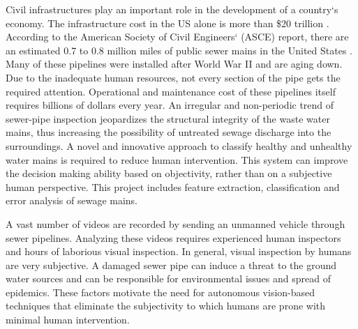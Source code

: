 \documentclass[letterpaper,12pt, onecolumn]{article}%
\begin{document}
Civil infrastructures play an important role in the development of a country`s economy. The infrastructure cost in the US alone is more than \$20 trillion \cite{iyer2013automated}. According to the American Society of Civil Engineers` (ASCE) report, there are an estimated 0.7 to 0.8 million miles of public sewer mains in the United States \cite{asce2013}. Many of these pipelines were installed after World War II and are aging down. Due to the inadequate human resources, not every section of the pipe gets the required attention. Operational and maintenance cost of these pipelines itself requires billions of dollars every year. An irregular and non-periodic trend of sewer-pipe inspection jeopardizes the structural integrity of the waste water mains, thus increasing the possibility of untreated sewage discharge into the surroundings. A novel and innovative approach to classify healthy and unhealthy water mains is required to reduce human intervention. This system can improve the decision making ability based on objectivity, rather than on a subjective human perspective. This project includes feature extraction, classification and error analysis of sewage mains.

A vast number of videos are recorded by sending an unmanned vehicle through sewer pipelines. Analyzing these videos requires experienced human inspectors and hours of laborious visual inspection. In general, visual inspection by humans are very subjective. A damaged sewer pipe can induce a threat to the ground water sources and can be responsible for environmental issues and spread of epidemics. These factors motivate the need for autonomous vision-based techniques that eliminate the subjectivity to which humans are prone with minimal human intervention. 
\end{document}
